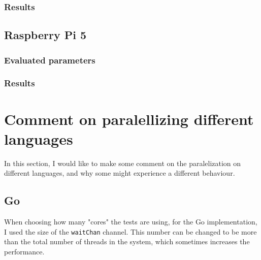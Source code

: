 \subsubsection{Results}





\subsection{Raspberry Pi 5}
\subsubsection{Evaluated parameters}
\subsubsection{Results}


\section{Comment on paralellizing different languages}

In this section, I would like to make some comment on the paralelization on different languages, and why some might experience a different behaviour. 

\subsection{Go}
When choosing how many "cores" the tests are using, for the Go implementation, I used the size of the \texttt{waitChan} channel. This number can be changed to be more than the total number of threads in the system, which sometimes increases the performance.


